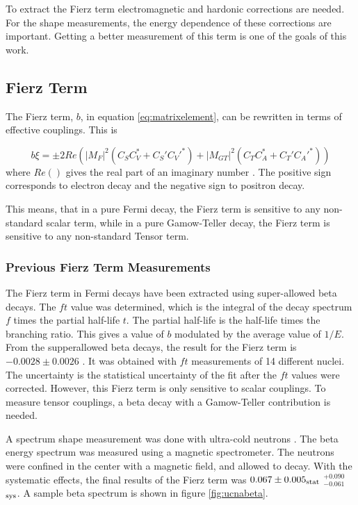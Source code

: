\documentclass[../MaxHughesThesis.tex]{subfiles}
\begin{document}
To extract the Fierz term electromagnetic and hardonic corrections are needed.
For the shape measurements, the energy dependence of these corrections are important.
Getting a better measurement of this term is one of the goals of this work.

\subsection{Fierz Term}
The Fierz term, $b$, in equation \ref{eq:matrixelement}, can be rewritten in terms of effective couplings.
This is %

\begin{equation}
	b\xi =  \pm 2 Re(|M_{F}|^{2}(C_{S}C_{V}^{*} + C_{S}'C_{V}'^{*}) + |M_{GT}|^{2}(C_{T}C_{A}^{*} + C_{T}'C_{A}'^{*}))
	\label{eq:bwrittenout}
\end{equation}
where $Re()$ gives the real part of an imaginary number \cite{Jack57}.
The positive sign corresponds to electron decay and the negative sign to positron decay.  

This means, that in a pure Fermi decay, the Fierz term is sensitive to any non-standard scalar term, while in a pure Gamow-Teller decay, the Fierz term is sensitive to any non-standard Tensor term. 

\subsubsection{Previous Fierz Term Measurements}
The Fierz term in Fermi decays have been extracted using super-allowed beta decays.
The $ft$ value was determined, which is the integral of the decay spectrum $f$ times the partial half-life $t$.
The partial half-life is the half-life times the branching ratio.
This gives a value of $b$ modulated by the average value of $1/E$.
From the supperallowed beta decays, the result for the Fierz term is $-0.0028 \pm 0.0026$ \cite{Har17}.
It was obtained with $ft$ measurements of 14 different nuclei.
The uncertainty is the statistical uncertainty of the fit after the $ft$ values were corrected.
However, this Fierz term is only sensitive to scalar couplings.
To measure tensor couplings, a beta decay with a Gamow-Teller contribution is needed. 

A spectrum shape measurement was done with ultra-cold neutrons \cite{Hic17}.
The beta energy spectrum was measured using a magnetic spectrometer.
The neutrons were confined in the center with a magnetic field, and allowed to decay.
With the systematic effects, the final results of the Fierz term was $0.067 \pm 0.005_{\rm{stat}}$ $^{+0.090}_{-0.061}$ $_{\rm{sys}}$.
A sample beta spectrum is shown in figure \ref{fig:ucnabeta}.
\end{document}
